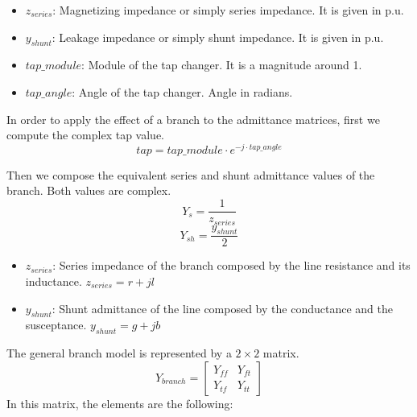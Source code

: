 \documentclass[nols,a4paper,twoside,symmetric,notoc,fleqn]{tufte-book}
\begin{document}
\begin{itemize}
	\item $z_{series}$: Magnetizing impedance or simply series impedance. It is given in p.u.
	\item $y_{shunt}$: Leakage impedance or simply shunt impedance. It is given in p.u.
	\item $tap\_module$: Module of the tap changer. It is a magnitude around 1.
	\item $tap\_angle$: Angle of the tap changer. Angle in radians.\newline
\end{itemize}




In order to apply the effect of a branch to the admittance matrices, first we compute the complex tap value.
$$tap = tap\_module \cdot e^{-j \cdot tap\_angle}$$  



Then we compose the equivalent series and shunt admittance values of the branch. Both values are complex.
$$Y_s = \frac{1}{z_{series}}$$
$$Y_{sh} = \frac{y_{shunt}}{2}$$

\begin{itemize}
	\item $z_{series}$: Series impedance of the branch composed by the line resistance and its inductance. $z_{series}=r + jl$
	
	\item $y_{shunt}$: Shunt admittance of the line composed by the conductance and the susceptance. $y_{shunt}=g+jb$\newline
\end{itemize}



The general branch model is represented by a $2 \times 2$ matrix.
$$
Y_{branch}=\left[ \begin{array}{ccc}
Y_{ff} & Y_{ft} \\
Y_{tf} & Y_{tt} \end{array} \right]
$$
In this matrix, the elements are the following:
\end{document}
